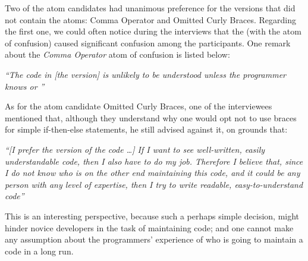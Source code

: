 Two of the atom candidates had unanimous preference for the
versions that did not contain the atoms: Comma Operator and
Omitted Curly Braces. Regarding the first one, we could
often notice during the interviews that
the \emph{\lhs} (with the atom of confusion) caused significant
confusion among the participants. One remark about
the \emph{Comma Operator} atom of confusion is listed below:


\begin{mq}
\emph{``The code in [the \lhs version] is unlikely to be understood unless the programmer knows \clang or \cpplang''}
\end{mq}

As for the atom candidate Omitted Curly Braces, one of the interviewees mentioned that, although they understand why one would opt not to use braces for simple if-then-else statements, he still advised against it, on grounds that:

\begin{mq}
\emph{``[I prefer the \rhs version of the code \ldots] If I want to see well-written, easily understandable code, then I also have to do my job. Therefore I believe that, since I do not know who is on the other end maintaining this code, and it could be any person with any level of expertise, then I try to write readable, easy-to-understand code''}
\end{mq}

This is an interesting perspective, because such a perhaps simple decision,  might hinder novice developers in the task of maintaining code; and one cannot make any assumption about the programmers' experience of who is going to maintain a code in a long run.

